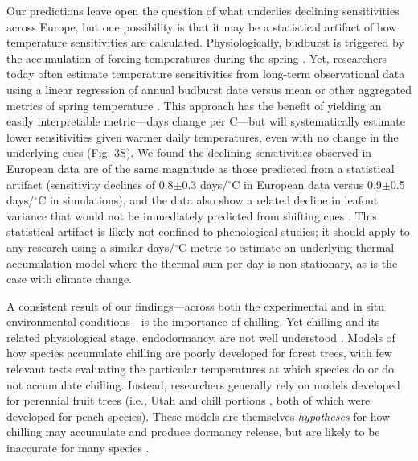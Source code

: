 \documentclass{article}
\begin{document}
\par Our predictions leave open the question of what underlies declining sensitivities across Europe, but one possibility is that it may be a statistical artifact of how temperature sensitivities are calculated.
Physiologically, budburst is triggered by the accumulation of forcing temperatures during the spring \citep{hanninen1995,chuine2016}. Yet, researchers today often estimate temperature sensitivities from long-term observational data using a linear regression of annual budburst date versus mean or other aggregated metrics of spring temperature \citep[e.g.,][]{Wolkovich:2012n}. This approach has the benefit of yielding an easily interpretable metric---days change per \degree C---but will systematically estimate lower sensitivities given warmer daily temperatures, even with no change in the underlying cues (Fig. 3S). We found the declining sensitivities observed in European data are of the same magnitude as those predicted from a statistical artifact (sensitivity declines of 0.8$\pm$0.3 days/$^{\circ}$C in European data versus 0.9$\pm$0.5 days/$^{\circ}$C in simulations), and the data also show a related decline in leafout variance that would not be immediately predicted from shifting cues \citep[see \emph{Potential statistical artifacts in declines of temperature sensitivity observational long-term data} in the Supplemental Materials and ][for further details]{gusewell2017}. This statistical artifact is likely not confined to phenological studies; it should apply to any research using a similar days/$^{\circ}$C metric to estimate an underlying thermal accumulation model where the thermal sum per day is non-stationary, as is the case with climate change. 

\par A consistent result of our findings---across both the experimental and in situ environmental conditions---is the importance of chilling. Yet chilling and its related physiological stage, endodormancy, are not well understood \citep{chuine2016}. Models of how species accumulate chilling are poorly developed for forest trees, with few relevant tests evaluating the particular temperatures at which species do or do not accumulate chilling. Instead, researchers generally rely on models developed for perennial fruit trees (i.e., Utah \citep{richardson1974} and chill portions \citep{fishman1987}, both of which were developed for peach species). These models are themselves \emph{hypotheses} for how chilling may accumulate and produce dormancy release, but are likely to be inaccurate for many species \citep{dennis2003}. 
\end{document}
